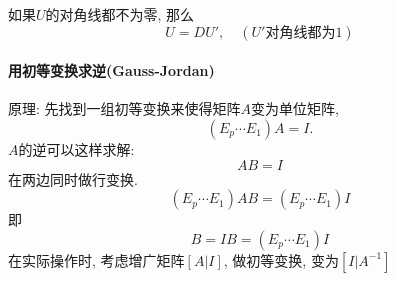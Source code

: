如果$U$的对角线都不为零, 那么
\begin{equation}
  U = D U' , \quad (U'\text{对角线都为1})
\end{equation}

\paragraph{用初等变换求逆(Gauss-Jordan)}
原理: 先找到一组初等变换来使得矩阵$A$变为单位矩阵,
\begin{equation}
  (E_p \cdots E_1)A = I.
\end{equation}
$A$的逆可以这样求解:
\begin{equation}
  AB = I
\end{equation}
在两边同时做行变换.
\begin{equation}
  (E_p\cdots E_1) AB = (E_p\cdots E_1)I
\end{equation}
即
\begin{equation}
  B = I B = (E_p \cdots E_1)I
\end{equation}
在实际操作时, 考虑增广矩阵$[A|I]$, 做初等变换, 变为$[I|A^{-1}]$
